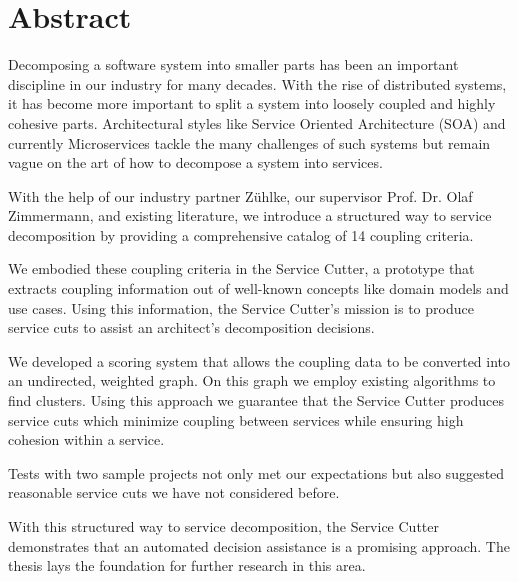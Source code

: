 \chapter{Abstract}

Decomposing a software system into smaller parts has been an important discipline in our industry for many decades. With the rise of distributed systems, it has become more important to split a system into loosely coupled and highly cohesive parts. Architectural styles like Service Oriented Architecture (SOA) and currently Microservices tackle the many challenges of such systems but remain vague on the art of how to decompose a system into services.

With the help of our industry partner Zühlke, our supervisor Prof. Dr. Olaf Zimmermann, and existing literature, we introduce a structured way to service decomposition by providing a comprehensive catalog of 14 coupling criteria.

We embodied these coupling criteria in the Service Cutter, a prototype that extracts coupling information out of well-known concepts like domain models and use cases. Using this information, the Service Cutter’s mission is to produce service cuts to assist an architect’s decomposition decisions. 

We developed a scoring system that allows the coupling data to be converted into an undirected, weighted graph. On this graph we employ existing algorithms to find clusters. Using this approach we guarantee that the Service Cutter produces service cuts which minimize coupling between services while ensuring high cohesion within a service. 

Tests with two sample projects not only met our expectations but also suggested reasonable service cuts we have not considered before. 

With this structured way to service decomposition, the Service Cutter demonstrates that an automated decision assistance is a promising approach. The thesis lays the foundation for further research in this area. 
